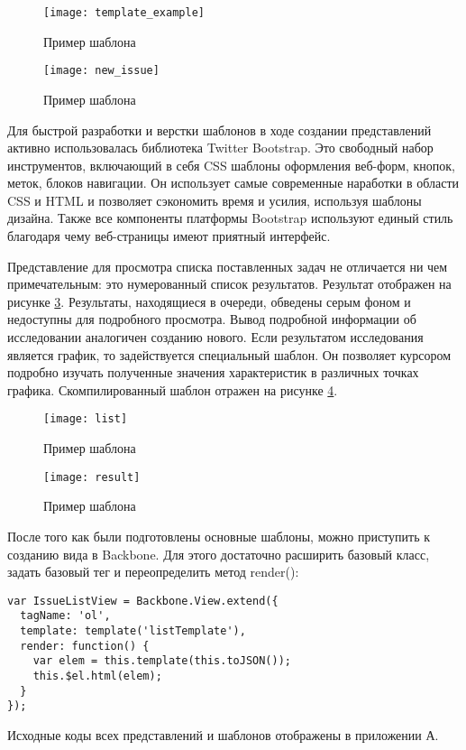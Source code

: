 \begin{figure}[ht]
\center\texttt{[image: template\_example]}
\caption{Пример шаблона}\label{template_example}
\end{figure}

\begin{figure}[ht]
\center\texttt{[image: new\_issue]}
\caption{Пример шаблона}\label{new_issue}
\end{figure}

Для быстрой разработки и верстки шаблонов в ходе создании представлений активно использовалась библиотека Twitter Bootstrap. Это свободный набор инструментов, включающий в себя CSS шаблоны оформления веб-форм, кнопок, меток, блоков навигации. Он использует самые современные наработки в области CSS и HTML и позволяет сэкономить время и усилия, используя шаблоны дизайна. Также все компоненты платформы Bootstrap используют единый стиль благодаря чему веб-страницы имеют приятный интерфейс.

Представление для просмотра списка поставленных задач не отличается ни чем примечательным: это нумерованный список результатов. Результат отображен на рисунке \ref{list}. Результаты, находящиеся в очереди, обведены серым фоном и недоступны для подробного просмотра. Вывод подробной информации об исследовании аналогичен созданию нового. Если результатом исследования является график, то задействуется специальный шаблон. Он позволяет курсором подробно изучать полученные значения характеристик в различных точках графика. Скомпилированный шаблон отражен на рисунке \ref{result}.

\begin{figure}[ht]
\center\texttt{[image: list]}
\caption{Пример шаблона}\label{list}
\end{figure}

\begin{figure}[ht]
\center\texttt{[image: result]}
\caption{Пример шаблона}\label{result}
\end{figure}

\lstset{ %
  language=JavaScript
}

После того как были подготовлены основные шаблоны, можно приступить к созданию вида в Backbone. Для этого достаточно расширить базовый класс, задать базовый тег и переопределить метод render():
\begin{lstlisting}
var IssueListView = Backbone.View.extend({
  tagName: 'ol',
  template: template('listTemplate'),
  render: function() {
    var elem = this.template(this.toJSON());
    this.$el.html(elem);
  }
});
\end{lstlisting}
Исходные коды всех представлений и шаблонов отображены в приложении А.

